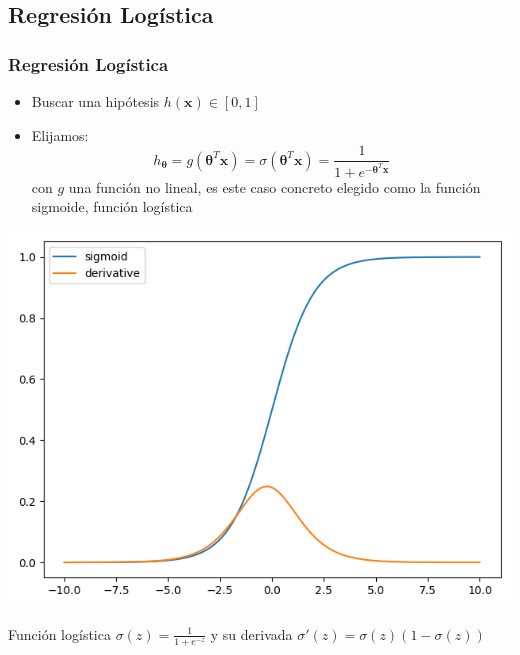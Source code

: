\documentclass[10pt]{beamer}
\begin{document}
\subsection{Regresión Logística}
\begin{frame}
  \frametitle{Regresión Logística}
   \begin{itemize}
   \item Buscar una hipótesis $h(\boldsymbol{x})\in \left[ 0, 1\right] $
   \item Elijamos: 
   \begin{equation*}
   h_{\boldsymbol{\theta}} = g(\boldsymbol{\theta}^T \boldsymbol{x})= \sigma (\boldsymbol{\theta}^T \boldsymbol{x})= \frac{1}{1+e^{-\boldsymbol{\theta}^T \boldsymbol{x}}} 
   \end{equation*}
   con $g$ una función no lineal, es este caso concreto elegido como la función sigmoide, función logística
   \end{itemize}


\begin{center}
\includegraphics[scale=0.3]{im1.png}
\end{center}   
   Función logística $\sigma(z)= \frac{1}{1+e^{-z}}$ y su derivada $\sigma ' (z)= \sigma(z)(1-\sigma(z))$
\end{frame}
\end{document}
